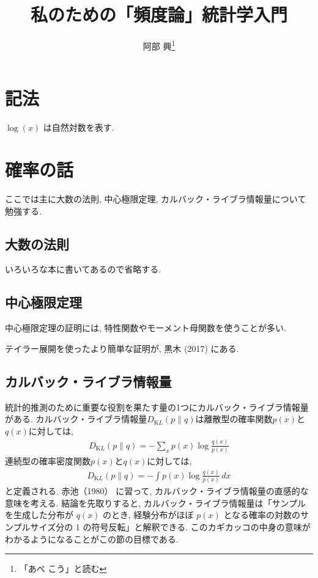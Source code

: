 \documentclass{jarticle}
\title{私のための「頻度論」統計学入門}
\author{阿部 興\footnote{「あべ こう」と読む}}
\begin{document}
\maketitle

\newcommand{\KL}{D_{\mathrm KL}}

\section*{記法}

$\log(x)$ は自然対数を表す.

\section{確率の話}
ここでは主に大数の法則, 中心極限定理, カルバック・ライブラ情報量について勉強する.

\subsection{大数の法則}

いろいろな本に書いてあるので省略する.

\subsection{中心極限定理}

中心極限定理の証明には, 特性関数やモーメント母関数を使うことが多い. 

テイラー展開を使ったより簡単な証明が, 黒木 (2017)\cite{Kuroki2017} にある. 

\subsection{カルバック・ライブラ情報量}
統計的推測のために重要な役割を果たす量の1つにカルバック・ライブラ情報量がある.
カルバック・ライブラ情報量$\KL(p\|q)$は離散型の確率関数$p(x)$と$q(x)$に対しては, 
\begin{align}
\KL(p\|q) = -\sum_{x} p(x) \log \frac{q(x)}{p(x)}
\end{align}
連続型の確率密度関数$p(x)$と$q(x)$に対しては, 
\begin{align}
\KL(p\|q) = -\int p(x) \log \frac{q(x)}{p(x)} \, dx
\end{align}
と定義される. 
赤池（1980）\cite{Akaike1980} に習って, カルバック・ライブラ情報量の直感的な意味を考える. 結論を先取りすると, カルバック・ライブラ情報量は「サンプルを生成した分布が $q(x)$ のとき, 経験分布がほぼ $p(x)$ となる確率の対数のサンプルサイズ分の 1 の符号反転」と解釈できる. このカギカッコの中身の意味がわかるようになることがこの節の目標である.
\end{document}
